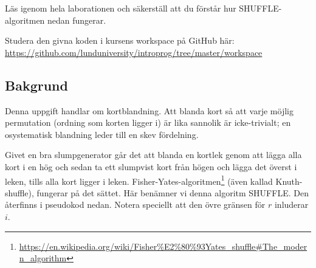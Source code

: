 

\Lab{\LabWeekSEVEN}

\begin{Goals}

\end{Goals}

\begin{Preparations}
\item {}
\item Läs igenom hela laborationen och säkerställ att du förstår hur SHUFFLE-algoritmen nedan fungerar.

\item Studera den givna koden i kursens workspace på GitHub här:\\
\url{https://github.com/lunduniversity/introprog/tree/master/workspace}

\end{Preparations}

\subsection{Bakgrund}\label{knuth-shuffle}

Denna uppgift handlar om kortblandning. Att blanda kort så att varje möjlig permutation (ordning som korten ligger i) är lika sannolik är icke-trivialt; en osystematisk blandning leder till en skev fördelning.

Givet en bra slumpgenerator går det att blanda en kortlek genom att lägga alla kort i en hög och sedan ta ett slumpvist kort från högen och lägga det överst i leken, tills alla kort ligger i leken. Fisher-Yates-algoritmen\footnote{\href{https://en.wikipedia.org/wiki/Fisher\%E2\%80\%93Yates_shuffle\#The_modern_algorithm}{https://en.wikipedia.org/wiki/Fisher\%E2\%80\%93Yates\_shuffle\#The\_modern\_algorithm}} (även kallad Knuth-shuffle), fungerar på det sättet. Här benämner vi denna algoritm SHUFFLE. Den återfinns i pseudokod nedan. Notera speciellt att den övre gränsen för $r$ inluderar $i$.

\begin{algorithm}[H]
\end{algorithm}

